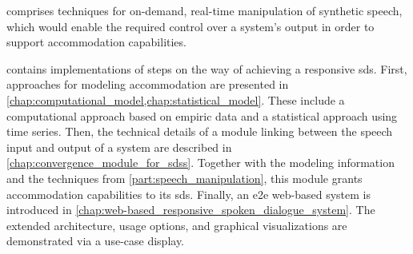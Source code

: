  comprises techniques for on-demand, real-time manipulation of synthetic speech, which would enable the required control over a system's output in order to support accommodation capabilities.

 contains implementations of steps on the way of achieving a responsive \acl{sds}.
First, approaches for modeling accommodation are presented in \cref{chap:computational_model,chap:statistical_model}.
These include a computational approach based on empiric data and a statistical approach using time series.
Then, the technical details of a module linking between the speech input and output of a system are described in \cref{chap:convergence_module_for_sdss}.
Together with the modeling information and the techniques from \cref{part:speech_manipulation}, this module grants accommodation capabilities to its \acl{sds}.
Finally, an \acl{e2e} web-based system is introduced in \cref{chap:web-based_responsive_spoken_dialogue_system}.
The extended architecture, usage options, and  graphical visualizations are demonstrated via a use-case display.

\label{outline_end}

\clearpage %
\pagestyle{fancy} %
\renewcommand{\headrulewidth}{0.4pt} %
\renewcommand{\chaptermark}[1]{\markboth{Chapter~\thechapter~--~#1}{}} %
\renewcommand{\sectionmark}[1]{\markright{\thesection\quad#1}} %
\fancyhead[LO]{\leftmark} %
\fancyhead[RE]{\rightmark} %

\addtocounter{page}{1} %

